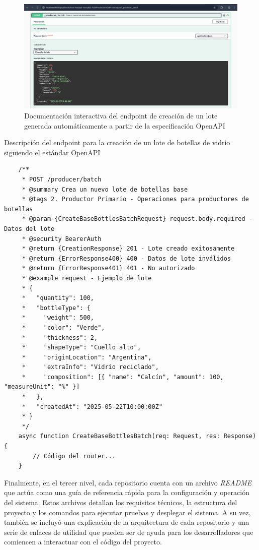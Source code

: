 \begin{figure}[!htb]
	\centering
	\includegraphics[width=\textwidth]{Figures/openapi-endpoint.png}
	\caption{Documentación interactiva del endpoint de creación de un lote generada automáticamente a partir de la especificación OpenAPI}
	\label{fig:openapi-docs}
\end{figure}

\begin{listing}[!tp]
\caption{Descripción del endpoint para la creación de un lote de botellas de vidrio siguiendo el estándar OpenAPI}
\label{listing:openapi-create-batch-code}
\begin{verbatim}
	/**
	 * POST /producer/batch
	 * @summary Crea un nuevo lote de botellas base
	 * @tags 2. Productor Primario - Operaciones para productores de botellas
	 * @param {CreateBaseBottlesBatchRequest} request.body.required - Datos del lote
	 * @security BearerAuth
	 * @return {CreationResponse} 201 - Lote creado exitosamente
	 * @return {ErrorResponse400} 400 - Datos de lote inválidos
	 * @return {ErrorResponse401} 401 - No autorizado
	 * @example request - Ejemplo de lote
	 * {
	 *   "quantity": 100,
	 *   "bottleType": {
	 *     "weight": 500,
	 *     "color": "Verde",
	 *     "thickness": 2,
	 *     "shapeType": "Cuello alto",
	 *     "originLocation": "Argentina",
	 *     "extraInfo": "Vidrio reciclado",
	 *     "composition": [{ "name": "Calcín", "amount": 100, "measureUnit": "%" }]
	 *   },
	 *   "createdAt": "2025-05-22T10:00:00Z"
	 * }
	 */
	async function CreateBaseBottlesBatch(req: Request, res: Response) {
		// Código del router...
	}
\end{verbatim}
\end{listing}

Finalmente, en el tercer nivel, cada repositorio cuenta con un archivo \textit{README} que actúa como una guía de referencia rápida para la configuración y operación del sistema. Estos archivos detallan los requisitos técnicos, la estructura del proyecto y los comandos para ejecutar pruebas y desplegar el sistema. A su vez, también se incluyó una explicación de la arquitectura de cada repositorio y una serie de enlaces de utilidad que pueden ser de ayuda para los desarrolladores que comiencen a interactuar con el código del proyecto.

